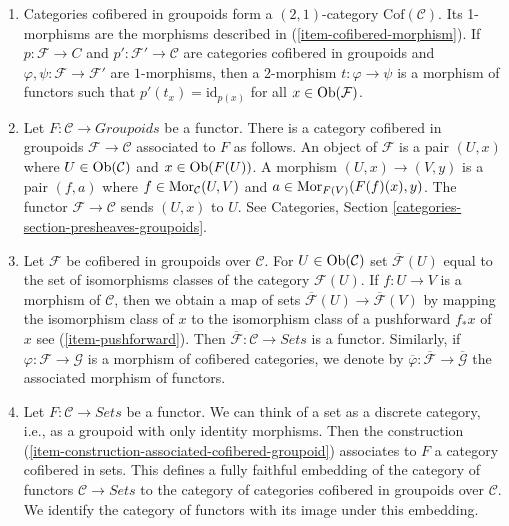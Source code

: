 \begin{remarks}
\begin{enumerate}
\item
\label{item-definition-cofibered-groupoids-2-category}
Categories cofibered in groupoids form a $(2, 1)$-category
$\text{Cof}(\mathcal{C})$. Its 1-morphisms are the morphisms described in
(\ref{item-cofibered-morphism}). If $p : \mathcal{F} \to C$ and
$p': \mathcal{F}' \to \mathcal{C}$ are categories cofibered in groupoids
and $\varphi, \psi : \mathcal{F} \to \mathcal{F}'$ are $1$-morphisms, then
a 2-morphism $t : \varphi \to \psi$ is a morphism of functors such that
$p'(t_x) = \text{id}_{p(x)}$ for all $x \in \mathop{\mathrm{Ob}}\nolimits(\mathcal{F})$.
\item
\label{item-construction-associated-cofibered-groupoid}
Let $F : \mathcal{C} \to \textit{Groupoids}$ be a functor. There
is a category cofibered in groupoids $\mathcal{F} \to \mathcal{C}$
associated to $F$ as follows. An object of $\mathcal{F}$ is a pair $(U, x)$
where $U \in \mathop{\mathrm{Ob}}\nolimits(\mathcal{C})$ and $x \in \mathop{\mathrm{Ob}}\nolimits(F(U))$. A
morphism $(U, x) \to (V, y)$ is a pair $(f, a)$ where
$f \in \mathop{\mathrm{Mor}}\nolimits_\mathcal{C}(U, V)$ and
$a \in \mathop{\mathrm{Mor}}\nolimits_{F(V)}(F(f)(x), y)$.
The functor $\mathcal{F} \to \mathcal{C}$ sends $(U, x)$ to $U$. See
Categories, Section \ref{categories-section-presheaves-groupoids}.
\item
\label{item-associated-functor-isomorphism-classes}
Let $\mathcal{F}$ be cofibered in groupoids over $\mathcal{C}$.
For $U \in \mathop{\mathrm{Ob}}\nolimits(\mathcal{C})$ set $\overline{\mathcal{F}}(U)$ equal to
the set of isomorphisms classes of the category $\mathcal{F}(U)$.
If $f : U \to V$ is a morphism of $\mathcal{C}$, then we obtain a
map of sets $\overline{\mathcal{F}}(U) \to \overline{\mathcal{F}}(V)$ by
mapping the isomorphism class of $x$ to the isomorphism class of a pushforward
$f_*x$ of $x$ see (\ref{item-pushforward}). Then
$\overline{\mathcal{F}} : \mathcal{C} \to \textit{Sets}$ is a
functor. Similarly, if $\varphi : \mathcal{F} \to \mathcal{G}$ is a
morphism of cofibered categories, we denote by
$\overline{\varphi}: \overline{\mathcal{F}} \to  \overline{\mathcal{G}}$
the associated morphism of functors.
\item
\label{item-convention-cofibered-sets}
Let $F: \mathcal{C} \to \textit{Sets}$ be a functor. We can think of a
set as a discrete category, i.e., as a groupoid with only identity morphisms.
Then the construction (\ref{item-construction-associated-cofibered-groupoid})
associates to $F$ a category cofibered in sets. This defines a fully
faithful embedding of the category of functors $\mathcal{C} \to \textit{Sets}$
to the category of categories cofibered in groupoids over $\mathcal{C}$.
We identify the category of functors with its image under this embedding.

\end{enumerate}
\end{remarks}
